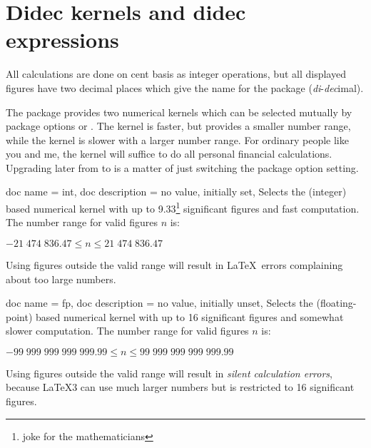 \documentclass[a4paper,11pt]{ltxdoc}
\begin{document}
\clearpage
\section{Didec kernels and didec expressions}%

All calculations are done on cent basis as integer operations, but all
displayed figures have two decimal places which give the name for the package
(\emph{di}-\emph{dec}imal).

The package provides two numerical kernels which can be selected mutually
by package options  or .
The  kernel is faster, but provides a smaller number range,
while the  kernel is slower with a larger number range.
For ordinary people like you and me, the  kernel will suffice
to do all personal financial calculations.
Upgrading later from  to  is a matter of
just switching the package option setting.

\begin{docPackageOptions}{{
    doc name = int,
    doc description = {no value, initially set},
  }}
Selects the  (integer) based numerical kernel with up to
9.33\footnote{joke for the mathematicians} significant figures and fast computation.
The number range for valid figures $n$ is:
\begin{center}
$ -21\;474\;836.47 \le n \le 21\;474\;836.47 $
\end{center}
\begin{dispListing}
\usepackage[int]{didec}
\end{dispListing}
Using figures outside the valid range will result in \LaTeX\ errors complaining
about too large numbers.
\end{docPackageOptions}


\begin{docPackageOptions}{{
    doc name = fp,
    doc description = {no value, initially unset},
  }}
Selects the  (floating-point) based numerical kernel with up to
16 significant figures and somewhat slower computation.
The number range for valid figures $n$ is:
\begin{center}
$ -99\;999\;999\;999\;999.99 \le n \le 99\;999\;999\;999\;999.99 $
\end{center}
\begin{dispListing}
\usepackage[fp]{didec}
\end{dispListing}
Using figures outside the valid range will result in \emph{silent calculation errors},
because \LaTeX3  can use much larger numbers but is restricted to 16
significant figures.
\end{docPackageOptions}
\end{document}
